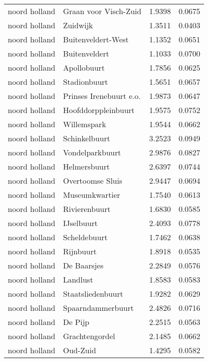\begin{longtable}{llcc}
noord holland & Graan voor Visch-Zuid & 1.9398 & 0.0675 \\
noord holland & Zuidwijk & 1.3511 & 0.0403 \\
noord holland & Buitenveldert-West & 1.1352 & 0.0651 \\
noord holland & Buitenveldert & 1.1033 & 0.0700 \\
noord holland & Apollobuurt & 1.7856 & 0.0625 \\
noord holland & Stadionbuurt & 1.5651 & 0.0657 \\
noord holland & Prinses Irenebuurt e.o. & 1.9873 & 0.0647 \\
noord holland & Hoofddorppleinbuurt & 1.9575 & 0.0752 \\
noord holland & Willemspark & 1.9544 & 0.0662 \\
noord holland & Schinkelbuurt & 3.2523 & 0.0949 \\
noord holland & Vondelparkbuurt & 2.9876 & 0.0827 \\
noord holland & Helmersbuurt & 2.6397 & 0.0744 \\
noord holland & Overtoomse Sluis & 2.9447 & 0.0694 \\
noord holland & Museumkwartier & 1.7540 & 0.0613 \\
noord holland & Rivierenbuurt & 1.6830 & 0.0585 \\
noord holland & IJselbuurt & 2.4093 & 0.0778 \\
noord holland & Scheldebuurt & 1.7462 & 0.0638 \\
noord holland & Rijnbuurt & 1.8918 & 0.0535 \\
noord holland & De Baarsjes & 2.2849 & 0.0576 \\
noord holland & Landlust & 1.8583 & 0.0583 \\
noord holland & Staatsliedenbuurt & 1.9282 & 0.0629 \\
noord holland & Spaarndammerbuurt & 2.4826 & 0.0716 \\
noord holland & De Pijp & 2.2515 & 0.0563 \\
noord holland & Grachtengordel & 2.1485 & 0.0662 \\
noord holland & Oud-Zuid & 1.4295 & 0.0582 \\
\hline
\end{longtable}
